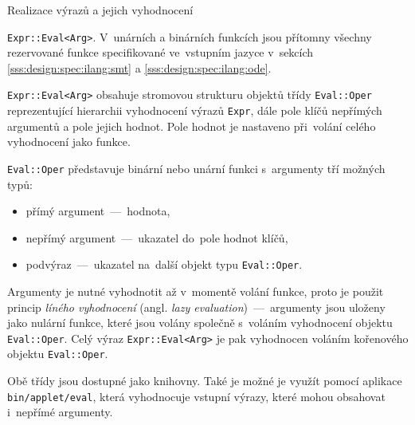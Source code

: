 \documentclass[thesis=M,czech]{FITthesis}[2012/06/26]
\newcommand{\id}[1]{\texttt{#1}}
\newcommand{\hl}[1]{\textit{#1}}
\newcommand{\name}[1]{\hl{#1}}
\newcommand{\rf}[1]{\ref{#1}}
\newcommand{\binDir}{\id{bin}}
\newcommand{\appletDir}{\id{\binDir{}/\-applet}}
\newcommand{\appletFn}[1]{\id{\appletDir{}/\-#1}}
\begin{document}
\begin{section}{Realizace výrazů a jejich vyhodnocení}
\begin{paragraph}{\id{Expr::\-Eval<Arg>}.}
V~unárních a binárních funkcích jsou přítomny všechny
rezervované funkce specifikované ve~vstupním jazyce
v~sekcích \rf{sss:design:spec:ilang:smt} a \rf{sss:design:spec:ilang:ode}.

\id{Expr::\-Eval<Arg>} obsahuje stromovou strukturu
objektů třídy \id{Eval::\-Oper}
reprezentující hierarchii vyhodnocení výrazů \id{Expr},
dále pole klíčů nepřímých argumentů a pole jejich hodnot.
Pole hodnot je nastaveno při~volání celého vyhodnocení jako funkce.

\id{Eval::\-Oper} představuje binární nebo unární funkci
s~argumenty tří možných typů:
\begin{itemize}
\item přímý argument~---~hodnota,
\item nepřímý argument~---~ukazatel do~pole hodnot klíčů,
\item podvýraz~---~ukazatel na~další objekt typu \id{Eval::\-Oper}.
\end{itemize}
Argumenty je nutné vyhodnotit až v~momentě volání funkce,
proto je použit princip \name{líného vyhodnocení}
(angl. \name{lazy evaluation})~---~argumenty jsou uloženy
jako nulární funkce, které jsou volány společně
s~voláním vyhodnocení objektu \id{Eval::\-Oper}.
Celý výraz \id{Expr::\-Eval<Arg>} je pak vyhodnocen
voláním kořenového objektu \id{Eval::\-Oper}.
\end{paragraph} %


\bigskip

Obě třídy jsou dostupné jako knihovny.
Také je možné je využít pomocí aplikace \appletFn{eval},
která vyhodnocuje vstupní výrazy,
které mohou obsahovat i~nepřímé argumenty.
\end{section} %

\end{document}
